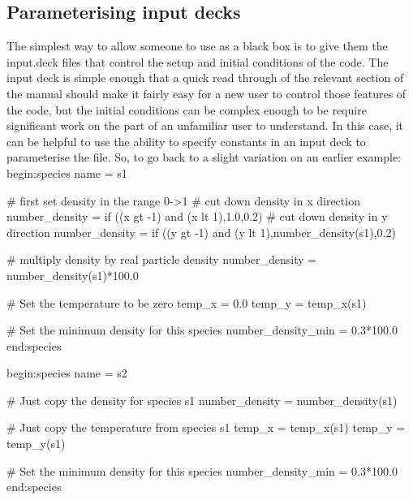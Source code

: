 \documentclass[12pt,a4paper]{article}
\newcommand{\EPOCH}{{\color{warwickdark}\fontfamily{phv}\selectfont{EPOCH}}}
\newenvironment{boxverbatim}{\lboxverbatim{none}}{\endlboxverbatim}
\begin{document}
\subsection{Parameterising input decks}
\label{sec:customising}
The simplest way to allow someone to use {\EPOCH} as a black box is to give them
the input.deck files that control the setup and initial conditions
of the code. The input deck is simple enough that a quick read through of the
relevant section of the manual should make it fairly easy for a new user to
control those features of the code, but the initial conditions can be complex
enough to be require significant work on the part of an unfamiliar user to
understand. In this case, it can be helpful to use the ability to specify
constants in an input deck to parameterise the file. So, to go back to a slight
variation on an earlier example:
\begin{boxverbatim}
begin:species
   name = s1

   # first set density in the range 0->1
   # cut down density in x direction
   number_density = if ((x gt -1) and (x lt 1),1.0,0.2)
   # cut down density in y direction
   number_density = if ((y gt -1) and (y lt 1),number_density(s1),0.2)

   # multiply density by real particle density
   number_density = number_density(s1)*100.0

   # Set the temperature to be zero
   temp_x = 0.0
   temp_y = temp_x(s1)

   # Set the minimum density for this species
   number_density_min = 0.3*100.0
end:species

begin:species
   name = s2

   # Just copy the density for species s1
   number_density = number_density(s1)

   # Just copy the temperature from species s1
   temp_x = temp_x(s1)
   temp_y = temp_y(s1)

   # Set the minimum density for this species
   number_density_min = 0.3*100.0
end:species
\end{boxverbatim}
\end{document}
